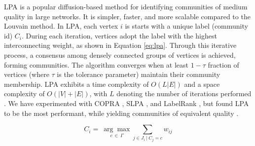 LPA is a popular diffusion-based method for identifying communities of medium quality in large networks. It is simpler, faster, and more scalable compared to the Louvain method. In LPA, each vertex $i$ is starts with a unique label (community id) $C_i$. During each iteration, vertices adopt the label with the highest interconnecting weight, as shown in Equation \ref{eq:lpa}. Through this iterative process, a consensus among densely connected groups of vertices is achieved, forming communities. The algorithm converges when at least $1-\tau$ fraction of vertices (where $\tau$ is the tolerance parameter) maintain their community membership. LPA exhibits a time complexity of $O(L |E|)$ and a space complexity of $O(|V| + |E|)$, with $L$ denoting the number of iterations performed \cite{com-raghavan07}. We have experimented with COPRA \cite{com-gregory10}, SLPA \cite{com-xie11}, and LabelRank \cite{com-xie13}, but found LPA to be the most performant, while yielding communities of equivalent quality \cite{sahu2023selecting}.

\begin{equation}
\label{eq:lpa}
  C_i =\ \underset{c\ \in \ \Gamma}{\arg\max} { \sum_{j \in J_i\ |\ C_j = c} w_{ij} }
\end{equation}
